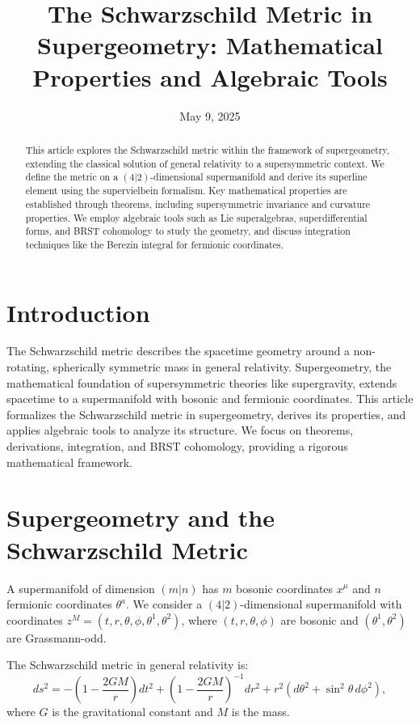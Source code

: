 \documentclass[12pt]{article}
\title{The Schwarzschild Metric in Supergeometry: Mathematical Properties and Algebraic Tools}
\author{}
\date{May 9, 2025}
\theoremstyle{plain}
\newcommand{\supercoords}{z^{M}}
\newcommand{\boscoords}{x^{\mu}}
\newcommand{\fermcoords}{\theta^{a}}
\newcommand{\superline}{ds^{2}}
\begin{document}
\maketitle

\begin{abstract}
This article explores the Schwarzschild metric within the framework of supergeometry, extending the classical solution of general relativity to a supersymmetric context. We define the metric on a $(4|2)$-dimensional supermanifold and derive its superline element using the supervielbein formalism. Key mathematical properties are established through theorems, including supersymmetric invariance and curvature properties. We employ algebraic tools such as Lie superalgebras, superdifferential forms, and BRST cohomology to study the geometry, and discuss integration techniques like the Berezin integral for fermionic coordinates.
\end{abstract}

\section{Introduction}

The Schwarzschild metric describes the spacetime geometry around a non-rotating, spherically symmetric mass in general relativity. Supergeometry, the mathematical foundation of supersymmetric theories like supergravity, extends spacetime to a supermanifold with bosonic and fermionic coordinates. This article formalizes the Schwarzschild metric in supergeometry, derives its properties, and applies algebraic tools to analyze its structure. We focus on theorems, derivations, integration, and BRST cohomology, providing a rigorous mathematical framework.

\section{Supergeometry and the Schwarzschild Metric}

A supermanifold of dimension $(m|n)$ has $m$ bosonic coordinates $\boscoords$ and $n$ fermionic coordinates $\fermcoords$. We consider a $(4|2)$-dimensional supermanifold with coordinates $\supercoords = (t, r, \theta, \phi, \theta^{1}, \theta^{2})$, where $(t, r, \theta, \phi)$ are bosonic and $(\theta^{1}, \theta^{2})$ are Grassmann-odd.

The Schwarzschild metric in general relativity is:
\begin{equation}
\superline = -\left(1 - \frac{2GM}{r}\right) dt^{2} + \left(1 - \frac{2GM}{r}\right)^{-1} dr^{2} + r^{2} (d\theta^{2} + \sin^{2}\theta \, d\phi^{2}),
\label{eq:schwarzschild}
\end{equation}
where $G$ is the gravitational constant and $M$ is the mass.
\end{document}

